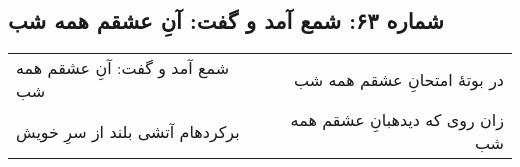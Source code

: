 \begin{center}
\section*{شماره ۶۳: شمع آمد و گفت: آنِ عشقم همه شب}
\label{sec:063}
\begin{longtable}{l p{0.5cm} r}
شمع آمد و گفت: آنِ عشقم همه شب
&&
در بوتهٔ امتحانِ عشقم همه شب
\\
برکردهام آتشی بلند از سرِ خویش
&&
زان روی که دیدهبانِ عشقم همه شب
\\
\end{longtable}
\end{center}
